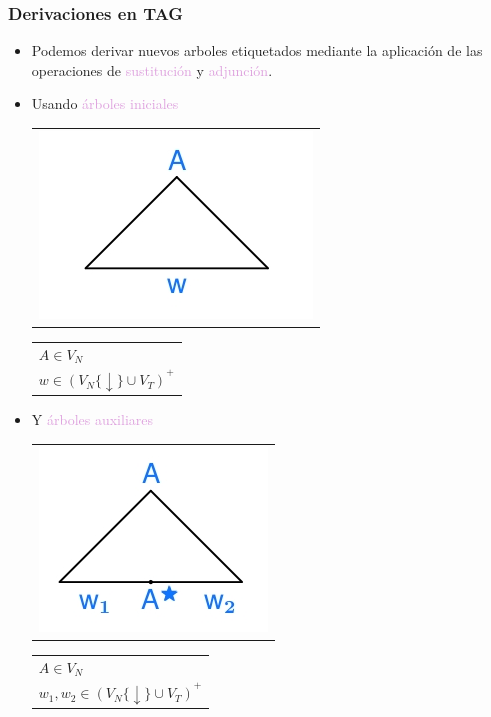 \documentclass[compress,color=usenames]{beamer}
\newcommand{\mH}[1]{\textcolor{Plum}{#1}}
\begin{document}
\begin{frame}
\frametitle{Derivaciones en TAG}

\begin{itemize}
\item Podemos derivar nuevos arboles etiquetados mediante la aplicaci\'on de 
las operaciones de \mH{sustituci\'on} y \mH{adjunci\'on}.\pause

\item Usando \mH{\'arboles iniciales}

\begin{tabular}{l}
\includegraphics[scale=.5]{pics/pic2-15.jpg}
\end{tabular}
\begin{tabular}{l}
$A \in V_N$\\
$w \in (V_N\{\downarrow \} \cup V_T)^+$\pause
\end{tabular}

\item Y \mH{\'arboles auxiliares}

\begin{tabular}{l}
\includegraphics[scale=.5]{pics/pic2-16.jpg}
\end{tabular}
\begin{tabular}{l}
$A \in V_N$\\
$w_1,w_2 \in (V_N\{\downarrow \} \cup V_T)^+$
\end{tabular}

\end{itemize}
\end{frame}
\end{document}
